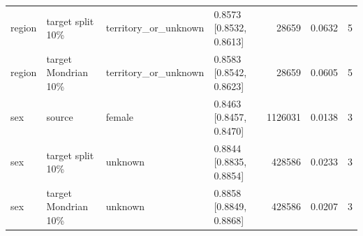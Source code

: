\begin{table}[!tbp]
\begin{tabularx}{\textwidth}{@{}L{2.0cm}L{2.35cm}L{2.8cm}L{2.7cm}rrr@{}}
region & target split 10\% & territory\_or\_unknown & 0.8573 [0.8532, 0.8613] & 28659 & 0.0632 & 5 \\
region & target Mondrian 10\% & territory\_or\_unknown & 0.8583 [0.8542, 0.8623] & 28659 & 0.0605 & 5 \\
sex & source & female & 0.8463 [0.8457, 0.8470] & 1126031 & 0.0138 & 3 \\
sex & target split 10\% & unknown & 0.8844 [0.8835, 0.8854] & 428586 & 0.0233 & 3 \\
sex & target Mondrian 10\% & unknown & 0.8858 [0.8849, 0.8868] & 428586 & 0.0207 & 3 \\
\bottomrule
\end{tabularx}
\end{table}
